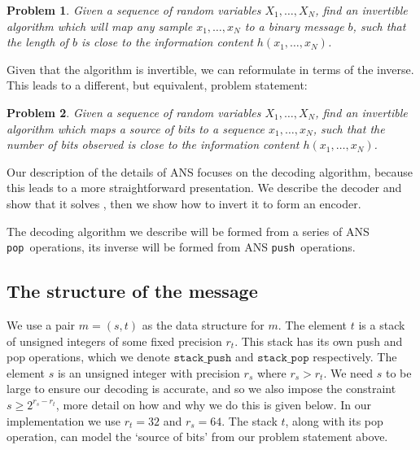 \documentclass{article}
\newtheorem{problem}{Problem}
\newcommand{\push}{\texttt{push}}
\newcommand{\pop}{\texttt{pop}}
\begin{document}
\begin{problem}\label{prob:default}
  Given a sequence of random variables $X_1, \ldots, X_N$, find an invertible
  algorithm which will map any sample $x_1, \ldots, x_N$ to a binary message
  $b$, such that the length of $b$ is close to the information content $h(x_1,
  \ldots, x_N)$.
\end{problem}

Given that the algorithm is invertible, we can reformulate 
in terms of the inverse. This leads to a different, but equivalent, problem
statement:

\begin{problem}\label{prob:alt}
  Given a sequence of random variables $X_1, \ldots, X_N$, find an invertible
  algorithm which maps a source of bits to a sequence $x_1, \ldots, x_N$, such
  that the number of bits observed is close to the information content $h(x_1,
  \ldots, x_N)$.
\end{problem}

Our description of the details of ANS focuses on the decoding algorithm,
because this leads to a more straightforward presentation. We describe the
decoder and show that it solves , then we show how to invert it
to form an encoder.

The decoding algorithm we describe will be formed from a series of ANS \pop\
operations, its inverse will be formed from ANS \push\ operations.

\subsection{The structure of the message}\label{sec:message}
We use a pair $m = (s, t)$ as the data structure for $m$. The element $t$ is a
stack of unsigned integers of some fixed precision $r_t$. This stack has its
own push and pop operations, which we denote $\texttt{stack\_push}$ and
$\texttt{stack\_pop}$ respectively. The element $s$ is an unsigned integer with
precision $r_s$ where $r_s > r_t$. We need $s$ to be large to ensure our
decoding is accurate, and so we also impose the constraint $s\geq2^{r_s -
r_t}$, more detail on how and why we do this is given below. In our
implementation we use $r_t = 32$ and $r_s = 64$. The stack $t$, along with its
pop operation, can model the `source of bits' from our problem statement above.
\end{document}
